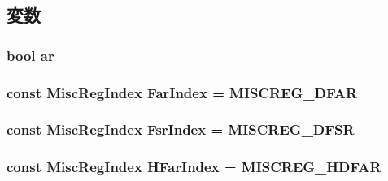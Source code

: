 \subsection{変数}
\hypertarget{classArmISA_1_1DataAbort_a3fd520eea10c5d7eb8490a0f8a53dc0b}{
\subsubsection[{ar}]{\setlength{\rightskip}{0pt plus 5cm}bool {\bf ar}}}
\label{classArmISA_1_1DataAbort_a3fd520eea10c5d7eb8490a0f8a53dc0b}
\hypertarget{classArmISA_1_1DataAbort_a3c751f200a61047c7edace6f38db43aa}{
\subsubsection[{FarIndex}]{\setlength{\rightskip}{0pt plus 5cm}const {\bf MiscRegIndex} {\bf FarIndex} = MISCREG\_\-DFAR}}
\label{classArmISA_1_1DataAbort_a3c751f200a61047c7edace6f38db43aa}
\hypertarget{classArmISA_1_1DataAbort_a0fc945049ae4ebc86b2c2765b65ab5c8}{
\subsubsection[{FsrIndex}]{\setlength{\rightskip}{0pt plus 5cm}const {\bf MiscRegIndex} {\bf FsrIndex} = MISCREG\_\-DFSR}}
\label{classArmISA_1_1DataAbort_a0fc945049ae4ebc86b2c2765b65ab5c8}
\hypertarget{classArmISA_1_1DataAbort_adf1eccd205afd5770084542cc2295d6c}{
\subsubsection[{HFarIndex}]{\setlength{\rightskip}{0pt plus 5cm}const {\bf MiscRegIndex} {\bf HFarIndex} = MISCREG\_\-HDFAR}}
\label{classArmISA_1_1DataAbort_adf1eccd205afd5770084542cc2295d6c}

